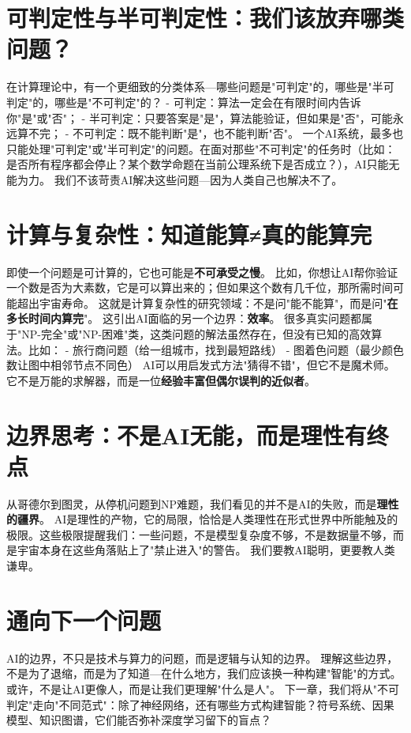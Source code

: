 \section*{可判定性与半可判定性：我们该放弃哪类问题？}

在计算理论中，有一个更细致的分类体系---哪些问题是"可判定"的，哪些是"半可判定"的，哪些是"不可判定"的？
- 可判定：算法一定会在有限时间内告诉你"是"或"否"；
- 半可判定：只要答案是"是"，算法能验证，但如果是"否"，可能永远算不完；
- 不可判定：既不能判断"是"，也不能判断"否"。
一个AI系统，最多也只能处理"可判定"或"半可判定"的问题。在面对那些"不可判定"的任务时（比如：是否所有程序都会停止？某个数学命题在当前公理系统下是否成立？），AI只能无能为力。
我们不该苛责AI解决这些问题---因为人类自己也解决不了。

\section*{计算与复杂性：知道能算≠真的能算完}

即使一个问题是可计算的，它也可能是\textbf{不可承受之慢}。
比如，你想让AI帮你验证一个数是否为大素数，它是可以算出来的；但如果这个数有几千位，那所需时间可能超出宇宙寿命。
这就是计算复杂性的研究领域：不是问"能不能算"，而是问"\textbf{在多长时间内算完}"。
这引出AI面临的另一个边界：\textbf{效率}。
很多真实问题都属于"NP-完全"或"NP-困难"类，这类问题的解法虽然存在，但没有已知的高效算法。比如：
- 旅行商问题（给一组城市，找到最短路线）
- 图着色问题（最少颜色数让图中相邻节点不同色）
AI可以用启发式方法"猜得不错"，但它不是魔术师。它不是万能的求解器，而是一位\textbf{经验丰富但偶尔误判的近似者}。

\section*{边界思考：不是AI无能，而是理性有终点}

从哥德尔到图灵，从停机问题到NP难题，我们看见的并不是AI的失败，而是\textbf{理性的疆界}。
AI是理性的产物，它的局限，恰恰是人类理性在形式世界中所能触及的极限。这些极限提醒我们：一些问题，不是模型复杂度不够，不是数据量不够，而是宇宙本身在这些角落贴上了"禁止进入"的警告。
我们要教AI聪明，更要教人类谦卑。

\section*{通向下一个问题}

AI的边界，不只是技术与算力的问题，而是逻辑与认知的边界。
理解这些边界，不是为了退缩，而是为了知道---在什么地方，我们应该换一种构建"智能"的方式。或许，不是让AI更像人，而是让我们更理解"什么是人"。
下一章，我们将从"不可判定"走向"不同范式"：除了神经网络，还有哪些方式构建智能？符号系统、因果模型、知识图谱，它们能否弥补深度学习留下的盲点？
\nocite{*}
\printbibliography[heading=bibintoc, title=\ebibname]
\newpage


